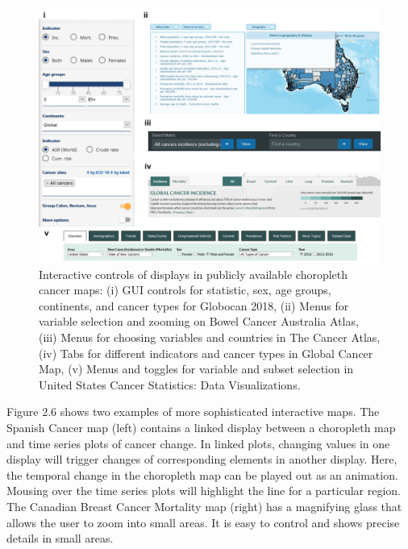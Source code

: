 \documentclass{monashthesis}
\begin{document}
\begin{figure}

{\centering \includegraphics[width=1\linewidth]{figures/02-literature/interacting} 

}

\caption{ Interactive controls of displays in publicly available choropleth cancer maps: (i) GUI controls for statistic, sex, age groups, continents, and cancer types for Globocan 2018, (ii) Menus for variable selection and zooming on Bowel Cancer Australia Atlas, (iii) Menus for choosing variables and countries in The Cancer Atlas, (iv) Tabs for different indicators and cancer types in Global Cancer Map, (v) Menus and toggles for variable and subset selection in United States Cancer Statistics: Data Visualizations.}\label{fig:interacting}
\end{figure}

Figure 2.6 shows two examples of more sophisticated interactive maps. The Spanish Cancer map (left) contains a linked display between a choropleth map and time series plots of cancer change. In linked plots, changing values in one display will trigger changes of corresponding elements in another display. Here, the temporal change in the choropleth map can be played out as an animation. Mousing over the time series plots will highlight the line for a particular region. The Canadian Breast Cancer Mortality map (right) has a magnifying glass that allows the user to zoom into small areas. It is easy to control and shows precise details in small areas.
\end{document}
